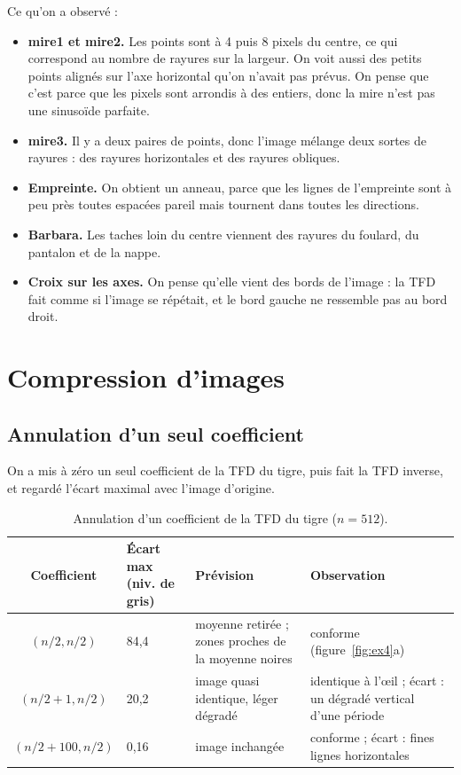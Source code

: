 \documentclass[11pt,a4paper]{article}
\begin{document}
Ce qu'on a observé :
\begin{itemize}
  \item \textbf{mire1 et mire2.} Les points sont à 4 puis 8 pixels du centre, ce qui
        correspond au nombre de rayures sur la largeur. On voit aussi des petits
        points alignés sur l'axe horizontal qu'on n'avait pas prévus. On pense que
        c'est parce que les pixels sont arrondis à des entiers, donc la mire n'est pas
        une sinusoïde parfaite.
  \item \textbf{mire3.} Il y a deux paires de points, donc l'image mélange deux
        sortes de rayures : des rayures horizontales et des rayures obliques.
  \item \textbf{Empreinte.} On obtient un anneau, parce que les lignes de l'empreinte
        sont à peu près toutes espacées pareil mais tournent dans toutes les
        directions.
  \item \textbf{Barbara.} Les taches loin du centre viennent des rayures du foulard,
        du pantalon et de la nappe.
  \item \textbf{Croix sur les axes.} On pense qu'elle vient des bords de
        l'image : la TFD fait comme si l'image se répétait, et le bord gauche ne
        ressemble pas au bord droit.
\end{itemize}

\section{Compression d'images}

\subsection{Annulation d'un seul coefficient}

On a mis à zéro un seul coefficient de la TFD du tigre, puis fait la TFD inverse, et
regardé l'écart maximal avec l'image d'origine.

\begin{table}[H]
\centering
\caption{Annulation d'un coefficient de la TFD du tigre ($n = 512$).}
\label{tab:ex4}
\begin{tabular}{|c|p{2.2cm}|p{4cm}|p{4.5cm}|}
\hline
\textbf{Coefficient} & \textbf{Écart max (niv. de gris)} & \textbf{Prévision} & \textbf{Observation} \\
\hline
$(n/2, n/2)$ & 84,4 &
  moyenne retirée ; zones proches de la moyenne noires & conforme
  (figure~\ref{fig:ex4}a) \\
\hline
$(n/2+1, n/2)$ & 20,2 &
  image quasi identique, léger dégradé & identique à l'\oe il ; écart : un dégradé
  vertical d'une période \\
\hline
$(n/2+100, n/2)$ & 0,16 & image inchangée & conforme ; écart : fines lignes
  horizontales \\
\hline
\end{tabular}
\end{table}
\end{document}
